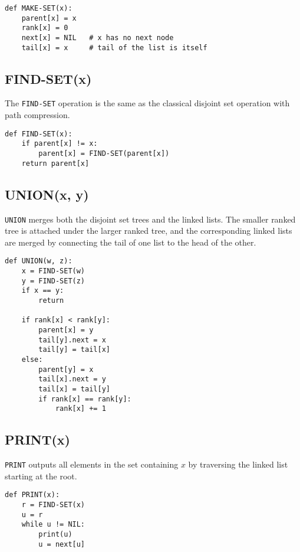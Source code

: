 \documentclass[12pt]{article}
\begin{document}
\begin{lstlisting}
def MAKE-SET(x):
    parent[x] = x
    rank[x] = 0
    next[x] = NIL   # x has no next node
    tail[x] = x     # tail of the list is itself
\end{lstlisting}

\subsection*{FIND-SET(x)}

The \texttt{FIND-SET} operation is the same as the classical disjoint set operation with path compression.

\begin{lstlisting}
def FIND-SET(x):
    if parent[x] != x:
        parent[x] = FIND-SET(parent[x])
    return parent[x]
\end{lstlisting}

\subsection*{UNION(x, y)}

\texttt{UNION} merges both the disjoint set trees and the linked lists. The smaller ranked tree is attached under the larger ranked tree, and the corresponding linked lists are merged by connecting the tail of one list to the head of the other.

\begin{lstlisting}
def UNION(w, z):
    x = FIND-SET(w)
    y = FIND-SET(z)
    if x == y:
        return
    
    if rank[x] < rank[y]:
        parent[x] = y
        tail[y].next = x
        tail[y] = tail[x]
    else:
        parent[y] = x
        tail[x].next = y
        tail[x] = tail[y]
        if rank[x] == rank[y]:
            rank[x] += 1
\end{lstlisting}

\subsection*{PRINT(x)}

\texttt{PRINT} outputs all elements in the set containing \( x \) by traversing the linked list starting at the root.

\begin{lstlisting}
def PRINT(x):
    r = FIND-SET(x)
    u = r
    while u != NIL:
        print(u)
        u = next[u]
\end{lstlisting}
\end{document}
